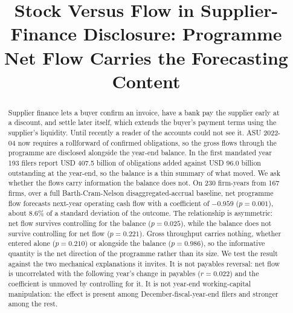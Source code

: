 \documentclass[conference,a4paper]{IEEEtran}
\begin{document}
\title{Stock Versus Flow in Supplier-Finance Disclosure:
Programme Net Flow Carries the Forecasting Content}

\author{
\and
{}
}

\maketitle

\begin{abstract}
Supplier finance lets a buyer confirm an invoice, have a bank pay the supplier
early at a discount, and settle later itself, which extends the buyer's payment
terms using the supplier's liquidity. Until recently a reader of the accounts
could not see it. ASU 2022-04 now requires a rollforward of confirmed
obligations, so the gross flows through the programme are disclosed alongside
the year-end balance. In the first mandated year 193 filers report USD 407.5 billion of obligations
added against USD 96.0 billion outstanding at the year-end, so the balance is a
thin summary of what moved. We ask whether the
flows carry information the balance does not. On 230 firm-years from 167 firms,
over a full Barth-Cram-Nelson disaggregated-accrual baseline, net programme flow
forecasts next-year operating cash flow with a coefficient of $-0.959$
($p = 0.001$), about 8.6\% of a standard deviation of the outcome. The
relationship is asymmetric: net flow survives controlling for the balance
($p = 0.025$), while the balance does not survive controlling for net flow
($p = 0.221$). Gross throughput carries nothing, whether entered alone
($p = 0.210$) or alongside the balance ($p = 0.986$), so the informative
quantity is the net direction of the programme rather than its size. We test the
result against the two mechanical explanations it invites. It is not payables
reversal: net flow is uncorrelated with the following year's change in payables
($r = 0.022$) and the coefficient is unmoved by controlling for it. It is not
year-end working-capital manipulation: the effect is present among
December-fiscal-year-end filers and stronger among the rest.
\end{abstract}
\end{document}
